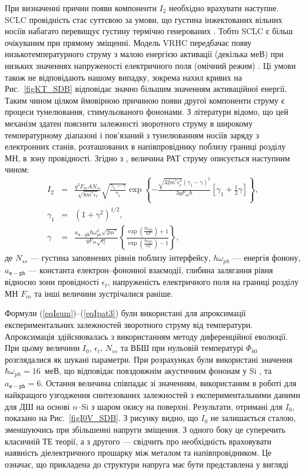 При визначенні причин появи компоненти $I_2$ необхідно врахувати наступне.
SCLC провідність стає суттєвою за умови, що густина інжектованих вільних носіїв
набагато перевищує густину термічно генерованих \cite{Jafar}.
Тобто SCLC є більш очікуваним при прямому зміщенні.
Модель VRHC передбачає появу низькотемпературного струму з малою енергією активації (декілька меВ) при
низьких значеннях напруженості електричного поля (омічний режим) \cite{Jafar}.
Ці умови також не відповідають нашому випадку, зокрема нахил кривих на Рис.~\ref{figKT_SDB} відповідає значно більшим значенням
активаційної енергії.
Таким чином цілком ймовірною причиною появи другої компоненти струму є процеси тунелювання, стимульованого фононами.
З літератури \cite{Pipinys1999,Pipinys2006,PipinsFTP} відомо, що цей механізм здатен пояснити залежності
зворотного струму в широкому температурному діапазоні і пов'язаний з тунелюванням
 носіїв заряду з електронних станів, розташованих в напівпровіднику поблизу границі розділу МН, в зону провідності.
Згідно з \cite{Pipinys2006,Kiveris}, величина РАТ струму описується наступним чином:
\begin{eqnarray}
\label{eqIpat}
 I_{2}&=&\frac{q^2F_mAN_{ss}}{\sqrt{8m^*\epsilon_t}}\sqrt{\frac{\gamma_1-\gamma}{\gamma_1}}\exp
    \left\{-\frac{\sqrt{32m^*\epsilon_t^3}\left(\gamma_1-\gamma\right)^2}{3qF_m\hbar}
    [\gamma_1+\frac{1}{2}\gamma]\right\}, \\
    \gamma_1&=&(1+\gamma^2)^{1/2},\\
\label{eqIpat3}
    \gamma&=&\frac{a_\mathtt{e-ph}\hbar\omega_{ph}^2\sqrt{2m^*}}{qF_m\sqrt{\epsilon_t}}
    \left\{\frac{\exp\left(\frac{\hbar\omega_{ph}}{kT}\right)+1}{\exp\left(\frac{\hbar\omega_{ph}}{kT}\right)-1}\right\},
\end{eqnarray}
де
$N_{ss}$ --- густина заповнених рівнів поблизу інтерфейсу,
$\hbar\omega_{ph}$ --- енергія фонону,
$a_\mathtt{e-ph}$ --- константа електрон--фононної взаємодії,
глибина залягання рівня відносно зони провідності $\epsilon_t$,
напруженість електричного поля на границі розділу МН $F_m$ та інші величини зустрічалися раніше.

Формули (\ref{eqIsum})--(\ref{eqIpat3}) були використані для апроксимації експериментальних залежностей зворотного струму від температури.
Апроксимація здійснювалась з використанням методу диференційної еволюції.
При цьому величини $I_0$, $\epsilon_t$, $N_{ss}$ та ВБШ при нульовій температурі $\Phi_{b0}$ розглядалися як шукані параметри.
При розрахунках були використані значення $\hbar\omega_{ph}=16$~меВ, що відповідає повздовжнім акустичним фононам у Si \cite[с.~312]{ShalimovaBook},
та $a_\mathtt{e-ph}=6$.
Остання величина співпадає зі значенням, використаним в роботі \cite{PipinsFTP} для найкращого узгодження синтезованих залежностей з експериментальними даними для ДШ на основі $n$--Si з шаром окису на поверхні.
Результати, отримані для $I_0$, показано на Рис.~\ref{figI0V_SDB}.
З рисунку видно, що $I_0$ не залишається сталою, зменшуючись при збільшенні напруги зміщення.
З одного боку це суперечить класичній ТЕ теорії, а з другого --- свідчить
про необхідність враховувати наявність діелектричного прошарку між металом та напівпровідником.
Це означає, що
прикладена до структури напруга має бути представлена у вигляді



